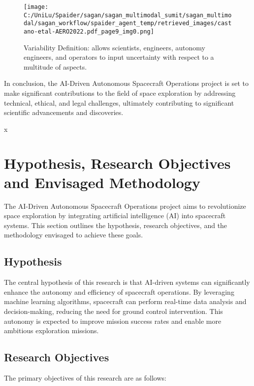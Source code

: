 \documentclass[a4paper,12pt]{article}
\begin{document}
\begin{figure}[htbp]
    \centering
    \texttt{[image: C:/UniLu/Spaider/sagan/sagan\_multimodal\_sumit/sagan\_multimodal/sagan\_workflow/spaider\_agent\_temp/retrieved\_images/castano-etal-AERO2022.pdf\_page9\_img0.png]}
    \caption{Variability Definition: allows scientists, engineers, autonomy engineers, and operators to input uncertainty with respect to a multitude of aspects.}
    \label{fig:variability-definition}
\end{figure}

In conclusion, the AI-Driven Autonomous Spacecraft Operations project is set to make significant contributions to the field of space exploration by addressing technical, ethical, and legal challenges, ultimately contributing to significant scientific advancements and discoveries.



x
\section{Hypothesis, Research Objectives and Envisaged Methodology}

The AI-Driven Autonomous Spacecraft Operations project aims to revolutionize space exploration by integrating artificial intelligence (AI) into spacecraft systems. This section outlines the hypothesis, research objectives, and the methodology envisaged to achieve these goals.

\subsection{Hypothesis}

The central hypothesis of this research is that AI-driven systems can significantly enhance the autonomy and efficiency of spacecraft operations. By leveraging machine learning algorithms, spacecraft can perform real-time data analysis and decision-making, reducing the need for ground control intervention. This autonomy is expected to improve mission success rates and enable more ambitious exploration missions.

\subsection{Research Objectives}

The primary objectives of this research are as follows:
\end{document}
